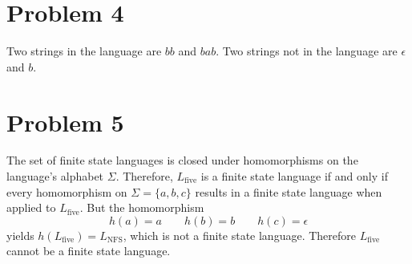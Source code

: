 \documentclass[12pt]{article}
\begin{document}
\section*{Problem 4}

Two strings in the language are \(bb\) and \(bab\). Two strings not in the language are \(\epsilon\) and \(b\).

\section*{Problem 5}

The set of finite state languages is closed under homomorphisms on the language's alphabet \(\Sigma\). Therefore, \(L_\text{five}\) is a
finite state language if and only if every homomorphism on \(\Sigma=\{a, b, c\}\) results in a finite state language when applied
to \(L_\text{five}\). But the homomorphism
\[h(a)=a \qquad h(b)=b \qquad h(c)=\epsilon\]
yields \(h(L_\text{five})=L_\text{NFS}\), which is not a finite state language. Therefore \(L_\text{five}\) cannot be a finite
state language.
\end{document}
